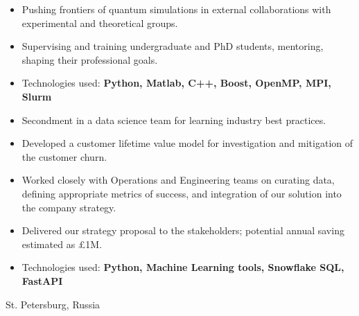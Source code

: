 \documentclass[10pt,a4paper,ragged2e,withhyper]{altacv}
\begin{document}
\begin{paracol}{2}
\begin{itemize}
    \item Pushing frontiers of quantum simulations in external collaborations
    with experimental and theoretical groups.

    \item Supervising and training undergraduate and PhD students, mentoring,
    shaping their professional goals.

    \item Technologies used:
    {\bf Python, Matlab, C++, Boost, OpenMP, MPI, Slurm}
\end{itemize}

\newpage



\begin{itemize}
    \item Secondment in a data science team for learning industry best
    practices.
    
    \item Developed a customer lifetime value model for investigation and
    mitigation of the customer churn.

    \item Worked closely with Operations and Engineering teams on curating data,
    defining appropriate metrics of success, and integration of our solution
    into the company strategy.

    \item Delivered our strategy proposal to the stakeholders; 
    potential annual saving estimated as £1M.

    \item Technologies used: 
    {\bf Python, Machine Learning tools, Snowflake SQL, FastAPI}
\end{itemize}

\divider

{St. Petersburg, Russia}


\end{paracol}
\end{document}
